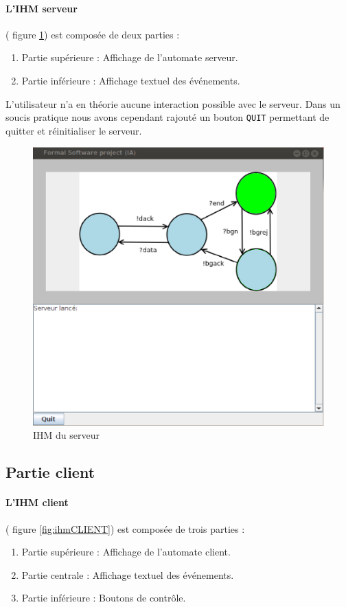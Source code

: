 \paragraph{L'IHM serveur} (\cf{} figure \ref{fig:ihmIA}) est composée de deux parties : 
\begin{enumerate}
\item 
Partie supérieure : Affichage de l'automate serveur.
\item
Partie inférieure : Affichage textuel des événements.
\end{enumerate}
L'utilisateur n'a en théorie aucune interaction possible avec le serveur. Dans un soucis pratique nous avons cependant rajouté un bouton \texttt{QUIT} permettant de quitter et réinitialiser le serveur.
 \begin{figure}[htb]
   \centering
   \includegraphics[scale=.5]{img/ihmIA.eps}
   \caption{IHM du serveur}
   \label{fig:ihmIA}
 \end{figure}


\clearpage
\subsection{Partie client}
\paragraph{L'IHM client}(\cf{} figure \ref{fig:ihmCLIENT}) est composée de trois parties : 
\begin{enumerate}
\item 
Partie supérieure : Affichage de l'automate client.
\item
Partie centrale : Affichage textuel des événements.
\item 
Partie inférieure : Boutons de contrôle.
\end{enumerate}

